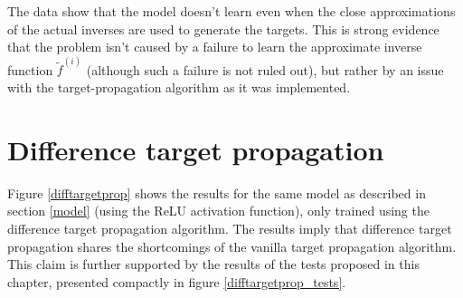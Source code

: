 The data show that the model doesn't learn even when the close approximations of the actual inverses are used to generate the targets. This is strong evidence that the problem isn't caused by a failure to learn the approximate inverse function \( \widetilde{f}^{(i)} \) (although such a failure is not ruled out), but rather by an issue with the target-propagation algorithm as it was implemented.

\section{Difference target propagation}
Figure \ref{difftargetprop} shows the results for the same model as described in section \ref{model} (using the ReLU activation function), only trained using the difference target propagation algorithm. The results imply that difference target propagation shares the shortcomings of the vanilla target propagation algorithm. This claim is further supported by the results of the tests proposed in this chapter, presented compactly in figure \ref{difftargetprop_tests}.

